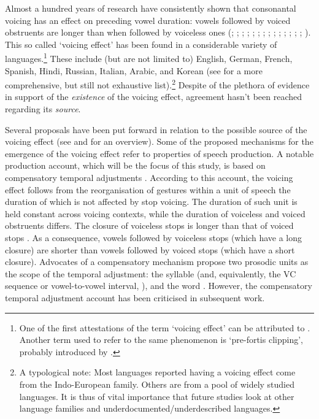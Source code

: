 \documentclass[charis]{glossa}
\begin{document}
Almost a hundred years of research have consistently shown that
consonantal voicing has an effect on preceding vowel duration: vowels
followed by voiced obstruents are longer than when followed by voiceless
ones (\citealt{meyer1904}; \citealt{heffner1937}; \citealt{house1953};
\citealt{belasco1953}; \citealt{peterson1960}; \citealt{halle1967};
\citealt{chen1970}; \citealt{klatt1973}; \citealt{lisker1974};
\citealt{laeufer1992}; \citealt{fowler1992}; \citealt{hussein1994};
\citealt{lampp2004}; \citealt{warren2005}; \citealt{durvasula2012}).
This so called `voicing effect' has been found in a considerable variety
of
languages.\footnote{One of the first attestations of the term `voicing effect' can be attributed to \citet{mitleb1982}. Another term used to refer to the same phenomenon is `pre-fortis clipping', probably introduced by \citet{wells1990}.}
These include (but are not limited to) English, German, French, Spanish,
Hindi, Russian, Italian, Arabic, and Korean (see \citealt{maddieson1976}
for a more comprehensive, but still not exhaustive
list).\footnote{A typological note: Most languages reported having a voicing effect come from the Indo-European family. Others are from a pool of widely studied languages. It is thus of vital importance that future studies look at other language families and underdocumented/underdescribed languages.}
Despite of the plethora of evidence in support of the \emph{existence}
of the voicing effect, agreement hasn't been reached regarding its
\emph{source}.

Several proposals have been put forward in relation to the possible
source of the voicing effect (see \citealt{soskuthy2013} and
\citealt{begus2017} for an overview). Some of the proposed mechanisms
for the emergence of the voicing effect refer to properties of speech
production. A notable production account, which will be the focus of
this study, is based on compensatory temporal adjustments
\citep{lindblom1967, slis1969a, slis1969, lehiste1970, lehiste1970a}.
According to this account, the voicing effect follows from the
reorganisation of gestures within a unit of speech the duration of which
is not affected by stop voicing. The duration of such unit is held
constant across voicing contexts, while the duration of voiceless and
voiced obstruents differs. The closure of voiceless stops is longer than
that of voiced stops
\citep{lisker1957, van-summers1987, davis1989, de-jong1991}. As a
consequence, vowels followed by voiceless stops (which have a long
closure) are shorter than vowels followed by voiced stops (which have a
short closure). Advocates of a compensatory mechanism propose two
prosodic units as the scope of the temporal adjustment: the syllable
(and, equivalently, the VC sequence or vowel-to-vowel interval,
\citealt{lindblom1967, farnetani1986}), and the word
\citep{slis1969a, slis1969, lehiste1970, lehiste1970a}. However, the
compensatory temporal adjustment account has been criticised in
subsequent work.
\end{document}
